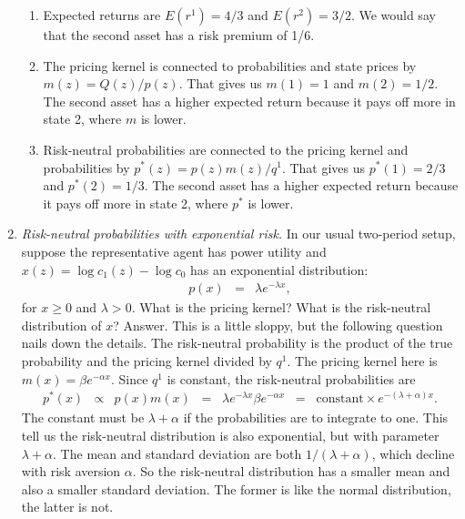 \documentclass[11pt]{article}
\begin{document}
\begin{enumerate}
\begin{enumerate}
\item Expected returns are
$ E(r^1) = 4/3$ and $E(r^2) = 3/2$.
We would say that the second asset has a risk premium of 1/6.

\item The pricing kernel is connected to probabilities and state
prices by $ m(z) = Q(z)/p(z)$.
That gives us $m(1) = 1$ and $m(2) = 1/2$.
The second asset has a higher expected return because it pays off more in state 2,
where $m$ is lower.

\item Risk-neutral probabilities
are connected to the pricing kernel and probabilities by
$ p^*(z) = p(z) m(z) /q^1 $.
That gives us $p^*(1) = 2/3$ and $p^*(2) = 1/3$.
The second asset has a higher expected return because it pays off more in state 2,
where $p^*$ is lower.

\end{enumerate}


\item {\it Risk-neutral probabilities with exponential risk.\/}
In our usual two-period setup, suppose the representative agent
has power utility and
$x(z) = \log c_1(z) - \log c_0 $ has an exponential distribution:
\begin{eqnarray*}
    p(x) &=& \lambda e^{-\lambda x} ,
\end{eqnarray*}
for $x \geq 0$ and $\lambda > 0$.
What is the pricing kernel?
What is the risk-neutral distribution of $x$?
%
Answer.
This is a little sloppy, but the following question nails down the details.
The risk-neutral probability is
the product of the true probability and the pricing kernel divided by $q^1$.
The pricing kernel here is $  m(x) = \beta e^{-\alpha x} $.
Since $q^1$ is constant, the risk-neutral probabilities are
\begin{eqnarray*}
    p^*(x) &\propto& p(x) m(x)
        \;\;=\;\; \lambda e^{-\lambda x} \beta e^{-\alpha x}
                \;\;=\;\; \mbox{constant} \times e^{-(\lambda + \alpha) x} .
\end{eqnarray*}
The constant must be $\lambda + \alpha$ if the probabilities are
to integrate to one.
This tell us the risk-neutral distribution is also exponential,
but with parameter $\lambda + \alpha$.
The mean and standard deviation are both $1/(\lambda+\alpha)$,
which decline with risk aversion $\alpha$.
So the risk-neutral distribution has a smaller mean
and also a smaller standard deviation.
The former is like the normal distribution, the latter is not.


\end{enumerate}
\end{document}
